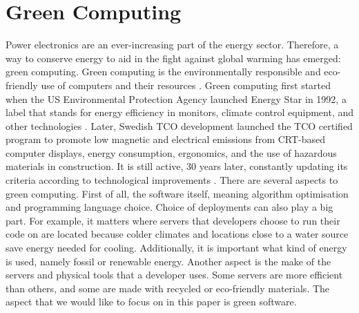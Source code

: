 \chapter{Green Computing}

Power electronics are an ever-increasing part of the energy sector. Therefore, a way to conserve energy to aid in the fight against global warming has emerged: green computing.
Green computing is the environmentally responsible and eco-friendly use of computers and their resources \cite{Salama20}. Green computing first started when the US Environmental Protection Agency launched Energy Star in 1992, a label that stands for energy efficiency in monitors, climate control equipment, and other technologies \cite{ENERGYSTAR}.
Later, Swedish TCO development launched the TCO certified program to promote low magnetic and electrical emissions from CRT-based computer displays, energy consumption, ergonomics, and the use of hazardous materials in construction. It is still active, 30 years later, constantly updating its criteria according to technological improvements \cite{TCOCertified}.
There are several aspects to green computing. First of all, the software itself, meaning algorithm optimisation and programming language choice. Choice of deployments can also play a big part. For example, it matters where servers that developers choose to run their code on are located because colder climates and locations close to a water source save energy needed for cooling. Additionally, it is important what kind of energy is used, namely fossil or renewable energy. Another aspect is the make of the servers and physical tools that a developer uses. Some servers are more efficient than others, and some are made with recycled or eco-friendly materials.
The aspect that we would like to focus on in this paper is green software.

